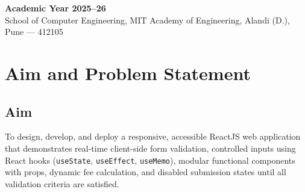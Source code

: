 \documentclass[11pt,a4paper]{article}
\begin{document}
\begin{titlepage}
    \vfill
    {\small \textbf{Academic Year 2025--26}}\\[0.2cm]
    {\footnotesize School of Computer Engineering, MIT Academy of Engineering, Alandi (D.), Pune --- 412105}
\end{titlepage}

\newpage

\section{Aim and Problem Statement}

\subsection{Aim}
To design, develop, and deploy a responsive, accessible ReactJS web application that demonstrates real-time client-side form validation, controlled inputs using React hooks (\texttt{useState}, \texttt{useEffect}, \texttt{useMemo}), modular functional components with props, dynamic fee calculation, and disabled submission states until all validation criteria are satisfied.
\end{document}
